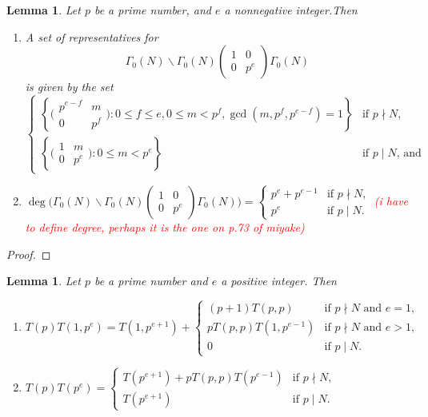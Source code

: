 \documentclass[10pt,leqno,twoside]{article}
\theoremstyle{plain}
\newtheorem{lemma}[lem]{Lemma}
\theoremstyle{definition}
\numberwithin{equation}{section}
\numberwithin{lem}{section}
\newcommand{\cbr}[1]{\left\{#1\right\}}
\newcommand{\textib}[1]{\textbf{\textit{#1\index{#1}}}} %
\newcommand{\tbd}{{\Huge\color{red}{\textib{TBD}}}}
\newcommand{\sai}[1]{\textcolor{red}{#1}}
\begin{document}
\begin{lemma}\label{lem: miyake lem 4.5.6}
    Let $p$ be a prime number, and $e$ a nonnegative integer.Then \begin{enumerate}[label=\textup{(\arabic*)}]
        \item A set of representatives for \[\varGamma_0(N)\backslash\varGamma_0(N)\begin{pmatrix}
            1 & 0 \\ 0 & p^e
        \end{pmatrix}\varGamma_0(N)\] is given by the set \[\begin{cases}
            \cbr{\big(\!\begin{smallmatrix}
                p^{e-f} & m \\ 0 & p^f
            \end{smallmatrix}\!\big) : 0\leq f\leq e, 0\leq m < p^f, \gcd(m,p^f,p^{e-f}) = 1} & \text{if $p\nmid N$},\\
            \cbr{\big(\!\begin{smallmatrix}
                1 & m \\ 0 & p^e
            \end{smallmatrix}\!\big) : 0\leq m < p^e} & \text{if $p\mid N$, and}
        \end{cases} \]
        \item $\deg\Big(\varGamma_0(N)\backslash\varGamma_0(N)\begin{pmatrix}
            1 & 0 \\ 0 & p^e
        \end{pmatrix}\varGamma_0(N)\Big) = \begin{cases}
            p^e + p^{e-1} & \text{if $p\nmid N$,}\\
            p^e & \text{if $p\mid N$.}
        \end{cases}$ \sai{(i have to define degree, perhaps it is the one on p.73 of miyake)}
    \end{enumerate}
\end{lemma}
\begin{proof}
    \tbd
\end{proof}
\begin{lemma}\label{lem: miyake lem 4.5.7}
    Let $p$ be a prime number and $e$ a positive integer. Then \begin{enumerate}[label=\textup{(\arabic*)}]
        \item $T(p)T(1,p^e) = T(1,p^{e+1}) + \begin{cases}
            (p+1)T(p,p) & \text{if $p\nmid N$ and $e=1$,}\\
            pT(p,p)T(1,p^{e-1}) & \text{if $p\nmid N$ and $e > 1$,}\\
            0 & \text{if $p\mid N$.}
        \end{cases}$
        \item $T(p)T(p^e) = \begin{cases}
            T(p^{e+1})+pT(p,p)T(p^{e-1}) & \text{if $p\nmid N$,}\\
            T(p^{e+1}) & \text{if $p\mid N$.}
        \end{cases}$
    \end{enumerate}
\end{lemma}
\end{document}

